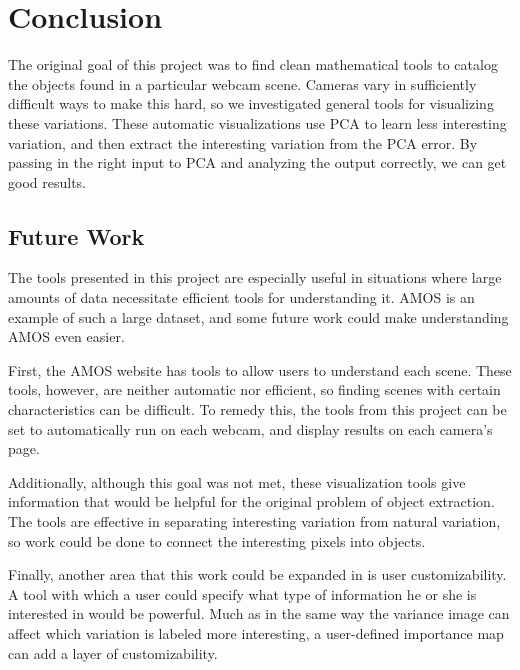 \chapter{Conclusion}
\label{cpt:conclusion}

The original goal of this project was to find clean mathematical tools to catalog the objects found in a particular webcam scene.  Cameras vary in sufficiently difficult ways to make this hard, so we investigated general tools for visualizing these variations.  These automatic visualizations use PCA to learn less interesting variation, and then extract the interesting variation from the PCA error.  By passing in the right input to PCA and analyzing the output correctly, we can get good results.

\section{Future Work}

The tools presented in this project are especially useful in situations where large amounts of data necessitate efficient tools for understanding it.  AMOS is an example of such a large dataset, and some future work could make understanding AMOS even easier.

First, the AMOS website has tools to allow users to understand each scene.  These tools, however, are neither automatic nor efficient, so finding scenes with certain characteristics can be difficult.  To remedy this, the tools from this project can be set to automatically run on each webcam, and display results on each camera's page.

Additionally, although this goal was not met, these visualization tools give information that would be helpful for the original problem of object extraction.  The tools are effective in separating interesting variation from natural variation, so work could be done to connect the interesting pixels into objects.

Finally, another area that this work could be expanded in is user customizability.  A tool with which a user could specify what type of information he or she is interested in would be powerful.  Much as in the same way the variance image can affect which variation is labeled more interesting, a user-defined importance map can add a layer of customizability.




